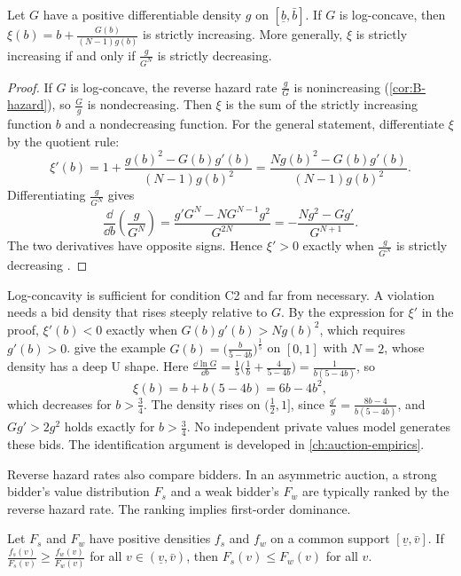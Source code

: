 \begin{proposition}\label{prop:B-gpv-monotone}
Let $G$ have a positive differentiable density $g$ on $[\underline b, \bar b]$. If $G$ is log-concave, then
$\xi(b) = b + \frac{G(b)}{(N - 1)g(b)}$ is strictly increasing. More generally, $\xi$ is strictly increasing if and
only if $\frac{g}{G^N}$ is strictly decreasing.
\end{proposition}

\begin{proof}
If $G$ is log-concave, the reverse hazard rate $\frac{g}{G}$ is nonincreasing (\cref{cor:B-hazard}), so
$\frac{G}{g}$ is nondecreasing. Then $\xi$ is the sum of the strictly increasing function $b$ and a nondecreasing
function. For the general statement, differentiate $\xi$ by the quotient rule:
\[
  \xi'(b) = 1 + \frac{g(b)^2 - G(b)g'(b)}{(N - 1)g(b)^2} = \frac{Ng(b)^2 - G(b)g'(b)}{(N - 1)g(b)^2}.
\]
Differentiating $\frac{g}{G^N}$ gives
\[
  \frac{\dd}{\dd b}\left(\frac{g}{G^N}\right) = \frac{g'G^N - NG^{N-1}g^2}{G^{2N}} = -\frac{Ng^2 - Gg'}{G^{N+1}}.
\]
The two derivatives have opposite signs. Hence $\xi' > 0$ exactly when $\frac{g}{G^N}$ is strictly decreasing
\citep[p.~530 and footnote 6]{GuerrePerrigneVuong2000}.
\end{proof}

Log-concavity is sufficient for condition C2 and far from necessary. A violation needs a bid density that
rises steeply relative to $G$. By the expression for $\xi'$ in the proof, $\xi'(b) < 0$ exactly when
$G(b)g'(b) > Ng(b)^2$, which requires $g'(b) > 0$. \citet[p.~530]{GuerrePerrigneVuong2000} give the example
$G(b) = \bigl(\frac{b}{5 - 4b}\bigr)^{\frac{1}{5}}$ on $[0, 1]$ with $N = 2$, whose density has a deep U shape. Here
$\frac{\dd\ln G}{\dd b} = \frac{1}{5}\bigl(\frac{1}{b} + \frac{4}{5 - 4b}\bigr) = \frac{1}{b(5 - 4b)}$, so
\[
  \xi(b) = b + b(5 - 4b) = 6b - 4b^2,
\]
which decreases for $b > \frac{3}{4}$. The density rises on $(\frac{1}{2}, 1]$, since $\frac{g'}{g} = \frac{8b -
4}{b(5 - 4b)}$, and $G g' > 2g^2$ holds exactly for $b > \frac{3}{4}$. No independent private values model generates these bids. The
identification argument is developed in \cref{ch:auction-empirics}.

Reverse hazard rates also compare bidders. In an asymmetric auction, a strong bidder's value distribution $F_s$
and a weak bidder's $F_w$ are typically ranked by the reverse hazard rate. The ranking implies first-order
dominance.

\begin{proposition}\label{prop:B-rh-fosd}
Let $F_s$ and $F_w$ have positive densities $f_s$ and $f_w$ on a common support $[\underline v, \bar v]$. If
$\frac{f_s(v)}{F_s(v)} \geq \frac{f_w(v)}{F_w(v)}$ for all $v \in (\underline v, \bar v)$, then $F_s(v) \leq F_w(v)$ for all $v$.
\end{proposition}

